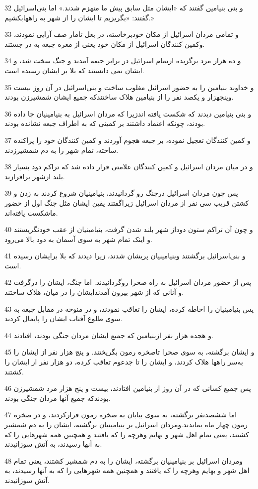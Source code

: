 \par 32 و بنی بنیامین گفتند که «ایشان مثل سابق پیش ما منهزم شدند.» اما بنی‌اسرائیل گفتند: «بگریزیم تا ایشان را از شهر به راههابکشیم.»
\par 33 و تمامی مردان اسرائیل از مکان خودبرخاسته، در بعل تامار صف آرایی نمودند، وکمین کنندگان اسرائیل از مکان خود یعنی از معره جبعه به در جستند.
\par 34 و ده هزار مرد برگزیده ازتمام اسرائیل در برابر جبعه آمدند و جنگ سخت شد، و ایشان نمی دانستند که بلا بر ایشان رسیده است.
\par 35 و خداوند بنیامین را به حضور اسرائیل مغلوب ساخت و بنی‌اسرائیل در آن روز بیست وپنجهزار و یکصد نفر را از بنیامین هلاک ساختندکه جمیع ایشان شمشیرزن بودند.
\par 36 و بنی بنیامین دیدند که شکست یافته اندزیرا که مردان اسرائیل به بنیامینیان جا داده بودند، چونکه اعتماد داشتند بر کمینی که به اطراف جبعه نشانده بودند.
\par 37 و کمین کنندگان تعجیل نموده، بر جبعه هجوم آوردند و کمین کنندگان خود را پراکنده ساخته، تمام شهر را به دم شمشیرزدند.
\par 38 و در میان مردان اسرائیل و کمین کنندگان علامتی قرار داده شد که تراکم دود بسیار بلند ازشهر برافرازند.
\par 39 پس چون مردان اسرائیل درجنگ رو گردانیدند، بنیامینیان شروع کردند به زدن و کشتن قریب سی نفر از مردان اسرائیل زیراگفتند یقین ایشان مثل جنگ اول از حضور ماشکست یافته‌اند.
\par 40 و چون آن تراکم ستون دوداز شهر بلند شدن گرفت، بنیامینیان از عقب خودنگریستند و اینک تمام شهر به سوی آسمان به دود بالا می‌رود.
\par 41 و بنی‌اسرائیل برگشتند وبنیامینیان پریشان شدند، زیرا دیدند که بلا برایشان رسیده است.
\par 42 پس از حضور مردان اسرائیل به راه صحرا روگردانیدند. اما جنگ، ایشان را در‌گرفت و آنانی که از شهر بیرون آمدندایشان را در میان، هلاک ساختند.
\par 43 پس بنیامینیان را احاطه کرده، ایشان را تعاقب نمودند، و در منوحه در مقابل جبعه به سوی طلوع آفتاب ایشان را پایمال کردند.
\par 44 و هجده هزار نفر ازبنیامین که جمیع ایشان مردان جنگی بودند، افتادند.
\par 45 و ایشان برگشته، به سوی صحرا تاصخره رمون بگریختند. و پنج هزار نفر از ایشان را به‌سر راهها هلاک کردند، و ایشان را تا جدعوم تعاقب کرده، دو هزار نفر از ایشان را کشتند.
\par 46 پس جمیع کسانی که در آن روز از بنیامین افتادند، بیست و پنج هزار مرد شمشیرزن بودندکه جمیع آنها مردان جنگی بودند.
\par 47 اما ششصدنفر برگشته، به سوی بیابان به صخره رمون فرارکردند، و در صخره رمون چهار ماه بماندند.ومردان اسرائیل بر بنیامینیان برگشته، ایشان را به دم شمشیر کشتند، یعنی تمام اهل شهر و بهایم وهرچه را که یافتند و همچنین همه شهرهایی را که به آنها رسیدند، به آتش سوزانیدند.
\par 48 ومردان اسرائیل بر بنیامینیان برگشته، ایشان را به دم شمشیر کشتند، یعنی تمام اهل شهر و بهایم وهرچه را که یافتند و همچنین همه شهرهایی را که به آنها رسیدند، به آتش سوزانیدند.
 
